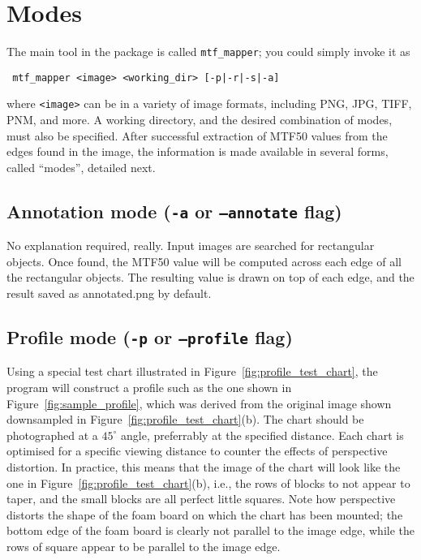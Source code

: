 \documentclass[a4paper]{article}
\begin{document}
\section{Modes}
The main tool in the package is called \texttt{mtf\_mapper}; you could simply
invoke it as 
\begin{verbatim} mtf_mapper <image> <working_dir> [-p|-r|-s|-a]
\end{verbatim}
where \texttt{<image>} can be in a variety of image formats, including 
PNG, JPG, TIFF, PNM, and more. A working directory, and the desired
combination of modes, must also be specified.
After successful extraction of MTF50 values from the edges found in 
the image, the information is made available in several forms, called 
``modes'', detailed next.

\subsection{Annotation mode (\texttt{-a} or \texttt{--annotate} flag)}
\label{sec:annotation_mode}
No explanation required, really. Input images are searched for rectangular
objects. Once found, the MTF50 value will be computed across each edge of
all the rectangular objects. The resulting value is drawn on top of each
edge, and the result saved as \textrm{annotated.png} by default.

\subsection{Profile mode (\texttt{-p} or \texttt{--profile} flag)}
\label{sec:profile_mode}
Using a special test chart illustrated in Figure~\ref{fig:profile_test_chart}, 
the program will construct a profile such as the one shown in 
Figure~\ref{fig:sample_profile}, which was derived from the original image
shown downsampled in Figure~\ref{fig:profile_test_chart}(b). The chart should
be photographed at a $45^\circ$ angle, preferrably at the specified
distance. Each chart is optimised for a specific viewing distance to counter
the effects of perspective distortion. In practice, this means that the
image of the chart will look like the one in
Figure~\ref{fig:profile_test_chart}(b), i.e., the rows of blocks to not
appear to taper, and the small blocks are all perfect little squares. Note
how perspective distorts the shape of the foam board on which the chart has
been mounted; the bottom edge of the foam board is clearly not parallel to
the image edge, while the rows of square appear to be parallel to the image
edge.
\end{document}
